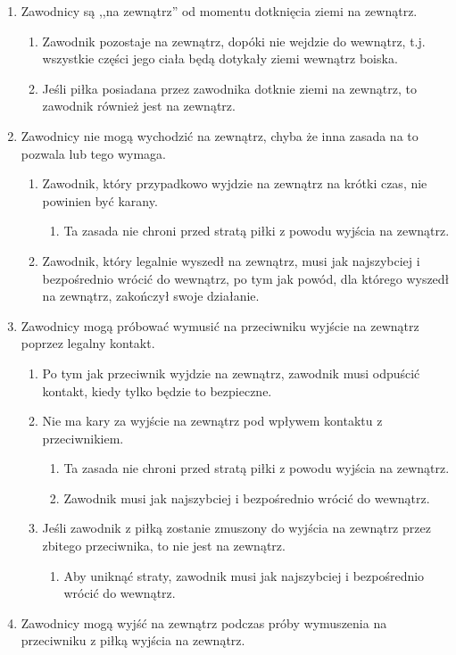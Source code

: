 \documentclass[11pt,a4paper]{article}
\renewcommand{\subsubsection}[1]{
  \oldsubsubsection{#1}%
  \label{\thesubsubsection}
}
\begin{document}
\subsubsection{Zawodnicy na zewnątrz boiska}
\begin{enumerate}
  \item Zawodnicy są ,,na zewnątrz'' od momentu dotknięcia ziemi na zewnątrz.
  \begin{enumerate}
    \item Zawodnik pozostaje na zewnątrz, dopóki nie wejdzie do wewnątrz, t.j. wszystkie części jego ciała będą dotykały ziemi wewnątrz boiska.
    \item Jeśli piłka posiadana przez zawodnika dotknie ziemi na zewnątrz, to zawodnik również jest na zewnątrz.
  \end{enumerate}
  \item Zawodnicy nie mogą wychodzić na zewnątrz, chyba że inna zasada na to pozwala lub tego wymaga.
  \begin{enumerate}
    \item Zawodnik, który przypadkowo wyjdzie na zewnątrz na krótki czas, nie powinien być karany.
    \begin{enumerate}
      \item Ta zasada nie chroni przed stratą piłki z powodu wyjścia na zewnątrz.
    \end{enumerate}
    \item Zawodnik, który legalnie wyszedł na zewnątrz, musi jak najszybciej i bezpośrednio wrócić do wewnątrz, po tym jak powód, dla którego wyszedł na zewnątrz, zakończył swoje działanie.
  \end{enumerate}
  \item Zawodnicy mogą próbować wymusić na przeciwniku wyjście na zewnątrz poprzez legalny kontakt.
  \begin{enumerate}
    \item Po tym jak przeciwnik wyjdzie na zewnątrz, zawodnik musi odpuścić kontakt, kiedy tylko będzie to bezpieczne.
    \item Nie ma kary za wyjście na zewnątrz pod wpływem kontaktu z przeciwnikiem.
    \begin{enumerate}
      \item Ta zasada nie chroni przed stratą piłki z powodu wyjścia na zewnątrz.
      \item Zawodnik musi jak najszybciej i bezpośrednio wrócić do wewnątrz.
    \end{enumerate}
    \item Jeśli zawodnik z piłką zostanie zmuszony do wyjścia na zewnątrz przez zbitego przeciwnika, to nie jest na zewnątrz.
    \begin{enumerate}
      \item Aby uniknąć straty, zawodnik musi jak najszybciej i bezpośrednio wrócić do wewnątrz.
    \end{enumerate}
  \end{enumerate}
  \item Zawodnicy mogą wyjść na zewnątrz podczas próby wymuszenia na przeciwniku z piłką wyjścia na zewnątrz.
\end{enumerate}
\end{document}
